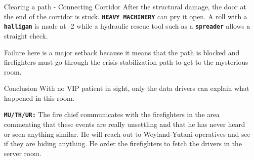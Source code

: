 \clearpage

\begin{rpg-commentbox}{Clearing a path - Connecting Corridor}    
    After the structural damage, the door at the end of the corridor is stuck.
    \texttt{\textbf{HEAVY MACHINERY}} can pry it open. 
    A roll with a \texttt{\textbf{halligan}} is made at -2 while a hydraulic rescue tool such as a \texttt{\textbf{spreader}} allows a straight check.

    Failure here is a major setback because it means that the path is blocked and firefighters must go through the crisis stabilization path to get to the mysterious room. 
\end{rpg-commentbox}  



\begin{rpg-commentbox}{Conclusion}
    With no VIP patient in sight, only the data drivers can explain what happened in this room.
    
    \texttt{\textbf{MU/TH/UR:}} The fire chief communicates with the firefighters in the area commenting that these events are really unsettling and that he has never heard or seen anything similar. He will reach out to Weyland-Yutani operatives and see if they are hiding anything. He order the firefighters to fetch the drivers in the server room.
\end{rpg-commentbox}  

%


